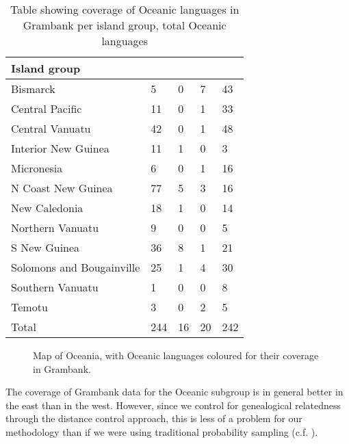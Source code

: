 \documentclass[a4paper,10pt]{article} %
\begin{document}
\begin{table}[h]
\caption{{Table showing coverage of Oceanic languages in Grambank per island group, total Oceanic languages}}
\label{GB_coverage_table_island_group}
\centering
\begin{tabular}{|l| p{2.7cm}| p{2.7cm} | p{2.7cm} |p{2.7cm} |}
  \hline
\textbf{Island group} & \textbf{\cellcolor{hedvig_orange!50}{No grammar}}  & \textbf{\cellcolor{hedvig_blue!50}{Grammar exists, but language not in Grambank (yet)}} &\textbf{\cellcolor{hedvig_lightgreen!50}{Less than half of the features covered in Grambank}} & \textbf{\cellcolor{hedvig_darkgreen!50}{More than half of the features covered in Grambank} } \\ 
  \hline
Bismarck & 5 & 0 & 7 & 43 \\ 
  Central Pacific & 11 & 0 & 1 & 33 \\ 
  Central Vanuatu & 42 & 0 & 1 & 48 \\ 
  Interior New Guinea & 11 & 1 & 0 & 3 \\ 
  Micronesia & 6 & 0 & 1 & 16 \\ 
  N Coast New Guinea & 77 & 5 & 3 & 16 \\ 
  New Caledonia & 18 & 1 & 0 & 14 \\ 
  Northern Vanuatu & 9 & 0 & 0 & 5 \\ 
  S New Guinea & 36 & 8 & 1 & 21 \\ 
  Solomons and Bougainville & 25 & 1 & 4 & 30 \\ 
  Southern Vanuatu & 1 & 0 & 0 & 8 \\ 
  Temotu & 3 & 0 & 2 & 5 \\ 
  Total & 244 & 16 & 20 & 242 \\   
\end{tabular}

\end{table}

\begin{sidewaysfigure}
\centering
\caption{{Map of Oceania, with Oceanic languages coloured for their coverage in Grambank.}}
\label{GB_austro_coverage}
\end{sidewaysfigure} %

The coverage of Grambank data for the Oceanic subgroup is in general better in the east than in the west. However, since we control for genealogical relatedness through the distance control approach, this is less of a problem for our methodology than if we were using traditional probability sampling (c.f. \citet{ross2004morphosyntactic}).
\end{document}
